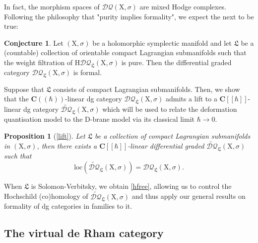 \documentclass{article}
\theoremstyle{plain}
\newtheorem{proposition}[theorem]{Proposition}
\theoremstyle{definition}
\newtheorem{conjecture}[theorem]{Conjecture}
\theoremstyle{remark}
\newcommand{\mr}{\mathrm}
\newcommand{\C}{\mathbf C}
\newcommand{\brak}{[\![\hbar]\!]}
\newcommand{\cbrak}{(\!(\hbar)\!)}
\newcommand{\3}{\vspace{3mm}}
\newcommand{\2}{\vspace{2mm}}
\newcommand{\1}{\vspace{1mm}}
\begin{document}
In fact, the morphism spaces of $\mathcal{DQ}(\mr{X},\sigma)$ are mixed Hodge complexes. Following the philosophy that "purity implies formality", we expect the next to be true:
\begin{conjecture}
Let $(\mr{X},\sigma)$ be a holomorphic symplectic manifold and let $\mathfrak{L}$ be a (countable) collection of orientable compact Lagrangian submanifolds such that the weight filtration of $\mr{H}\mathcal{DQ}_\mathfrak{L}(\mr{X},\sigma)$ is pure. Then the differential graded category $\mathcal{DQ}_\mathfrak{L}(\mr{X},\sigma)$ is formal.
\end{conjecture}
Suppose that $\mathfrak{L}$ consists of compact Lagrangian submanifolds. Then, we show that the $\C\cbrak$-linear dg category  $\mathcal{DQ}_\mathfrak{L}(\mr{X},\sigma)$ admits a lift to a $\C\brak$-linear dg category $\widetilde{\mathcal{DQ}}_\mathfrak{L}(\mr{X},\sigma)$ which will be used to relate the deformation quantisation model to the $\mr{D}$-brane model via its classical limit $\hbar\to 0$. 
 \begin{proposition}[\cref{lift}]
Let $\mathfrak{L}$ be a collection of compact Lagrangian submanifolds in $(\mr{X},\sigma)$, then there exists a $\C\brak$-linear differential graded $\widetilde{\mathcal{DQ}}_\mathfrak{L}(\mr{X},\sigma)$ such that $$\mr{loc}\left(\widetilde{\mathcal{DQ}}_\mathfrak{L}(\mr{X},\sigma)\right)=\mathcal{DQ}_\mathfrak{L}(\mr{X},\sigma).$$ 
\end{proposition}
When $\mathfrak{L}$ is Solomon-Verbitsky, we obtain \cref{hfree}, allowing us to control the Hochschild (co)homology of $\widetilde{\mathcal{DQ}}_\mathfrak{L}(\mr{X},\sigma)$ and thus apply our general results on formality of dg categories in families to it.
\subsection{The virtual de Rham category}
\end{document}
